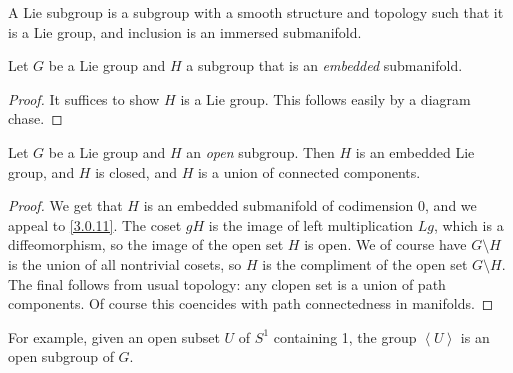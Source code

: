 
\begin{definition}\label{?}
	A Lie subgroup is a subgroup with a smooth structure and topology such that it is a Lie group, and inclusion is an immersed submanifold.
\end{definition}

\begin{proposition}\label{3.0.11}
	Let $G$ be a Lie group and $H$ a subgroup that is an \emph{embedded} submanifold.
\end{proposition}
\begin{proof}
	It suffices to show $H$ is a Lie group. This follows easily by a diagram chase.
\end{proof}

\begin{lemma}\label{3.0.12}
	Let $G$ be a Lie group and $H$ an \emph{open} subgroup. Then $H$ is an embedded Lie group, and $H$ is closed, and $H$ is a union of connected components.
\end{lemma}
\begin{proof}
	We get that $H$ is an embedded submanifold of codimension 0, and we appeal to \cref{3.0.11}. The coset $gH$ is the image of left multiplication $Lg$, which is a diffeomorphism, so the image of the open set $H$ is open. We of course have $G\setminus H$ is the union of all nontrivial cosets, so $H$ is the compliment of the open set $G\setminus H$. The final follows from usual topology: any clopen set is a union of path components. Of course this coencides with path connectedness in manifolds.
\end{proof}

For example, given an open subset $U$ of $S^1$ containing 1, the group $\left\langle U \right\rangle $ is an open subgroup of $G$.

